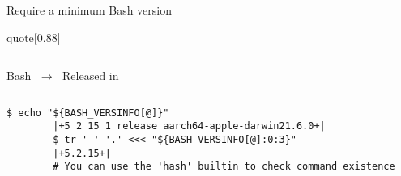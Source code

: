 \begin{frame}[fragile]{Require a minimum Bash version}
\begin{varblock*}{quote}[0.88\textwidth]{}
\begin{columns}[c]
\begin{column}{0.46\textwidth}
                Bash  $\;\longrightarrow\;$ Released in 
            \end{column}
            \qquad
        \end{columns}
    \end{varblock*}
    \begin{lstlisting}[style=MyBash, numbers=none]
        $ echo "${BASH_VERSINFO[@]}"
        |+5 2 15 1 release aarch64-apple-darwin21.6.0+|
        $ tr ' ' '.' <<< "${BASH_VERSINFO[@]:0:3}"
        |+5.2.15+|
        # You can use the 'hash' builtin to check command existence
    \end{lstlisting}
    \PrepareURLsymbol[PB]
\end{frame}
